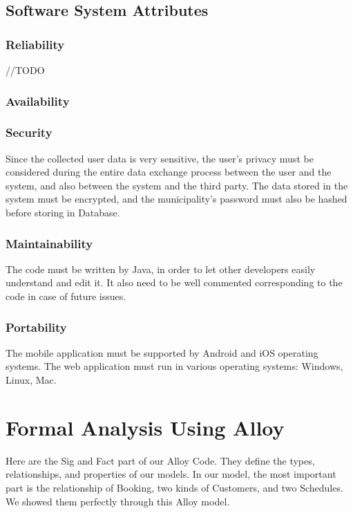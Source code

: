 \documentclass[a4paper,12pt]{report}
\begin{document}
\section{Software System Attributes}
\subsection{Reliability} 
//TODO
\subsection{Availability}

\subsection{Security} 
Since the collected user data is very sensitive, the user’s privacy must be considered during the entire data exchange process between the user and the system, and also between the system and the third party. The data stored in the system must be encrypted, and the municipality’s password must also be hashed before storing in Database.\\

\subsection{Maintainability} The code must be written by Java, in order to let other developers easily understand and edit it. It also need to be well commented corresponding to the code in case of future issues.\\

\subsection{Portability} The mobile application must be supported by Android and iOS operating systems. The web application must run in various operating systems: Windows, Linux, Mac.\\




\chapter{Formal Analysis Using Alloy}
Here are the Sig and Fact part of our Alloy Code. They define the types, relationships, and properties of our models. In our model, the most important part is the relationship of Booking, two kinds of Customers, and two Schedules. We showed them perfectly through this Alloy model. \\
\end{document}
